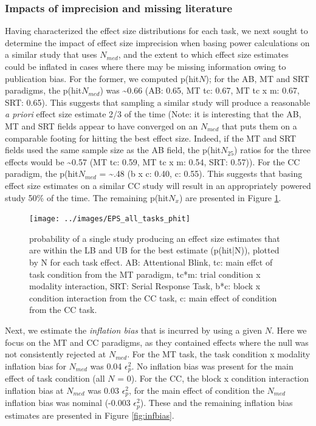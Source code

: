 \documentclass[
  man]{apa6}
\begin{document}
\hypertarget{impacts-of-imprecision-and-missing-literature}{%
\subsubsection{Impacts of imprecision and missing literature}\label{impacts-of-imprecision-and-missing-literature}}

Having characterized the effect size distributions for each task, we next sought to determine the impact of effect size imprecision when basing power calculations on a similar study that uses \(N_{med}\), and the extent to which effect size estimates could be inflated in cases where there may be missing information owing to publication bias. For the former, we computed p(hit\textbar{}\(N\)); for the AB, MT and SRT paradigms, the p(hit\textbar{}\(N_{med}\)) was \textasciitilde0.66 (AB: 0.65, MT tc: 0.67, MT tc x m: 0.67, SRT: 0.65). This suggests that sampling a similar study will produce a reasonable \emph{a priori} effect size estimate 2/3 of the time (Note: it is interesting that the AB, MT and SRT fields appear to have converged on an \(N_{med}\) that puts them on a comparable footing for hitting the best effect size. Indeed, if the MT and SRT fields used the same sample size as the AB field, the p(hit\textbar{}\(N_{25}\)) ratios for the three effects would be \textasciitilde0.57 (MT tc: 0.59, MT tc x m: 0.54, SRT: 0.57)). For the CC paradigm, the p(hit\textbar{}\(N_{med}\) = \textasciitilde.48 (b x c: 0.40, c: 0.55). This suggests that basing effect size estimates on a similar CC study will result in an appropriately powered study 50\% of the time. The remaining p(hit\textbar{}\(N_x\)) are presented in Figure \ref{fig:fxphit}.

\begin{figure}

{\centering \texttt{[image: ../images/EPS\_all\_tasks\_phit]} 

}

\caption{probability of a single study producing an effect size estimates that are within the LB and UB for the best estimate (p(hit|N)), plotted by N for each task effect. AB: Attentional Blink, tc: main effct of task condition from the MT paradigm, tc*m: trial condition x modality interaction, SRT: Serial Response Task, b*c: block x condition interaction from the CC task, c: main effect of condition from the CC task.}\label{fig:fxphit}
\end{figure}

Next, we estimate the \emph{inflation bias} that is incurred by using a given \(N\). Here we focus on the MT and CC paradigms, as they contained effects where the null was not consistently rejected at \(N_{med}\). For the MT task, the task condition x modality inflation bias for \(N_{med}\) was 0.04 \(\epsilon_p^2\). No inflation bias was present for the main effect of task condition (all \(N\) = 0). For the CC, the block x condition interaction inflation bias at \(N_{med}\) was 0.03 \(\epsilon_p^2\), for the main effect of condition the \(N_{med}\) inflation bias was nominal (-0.003 \(\epsilon_p^2\)). These and the remaining inflation bias estimates are presented in Figure \ref{fig:infbias}.
\end{document}
